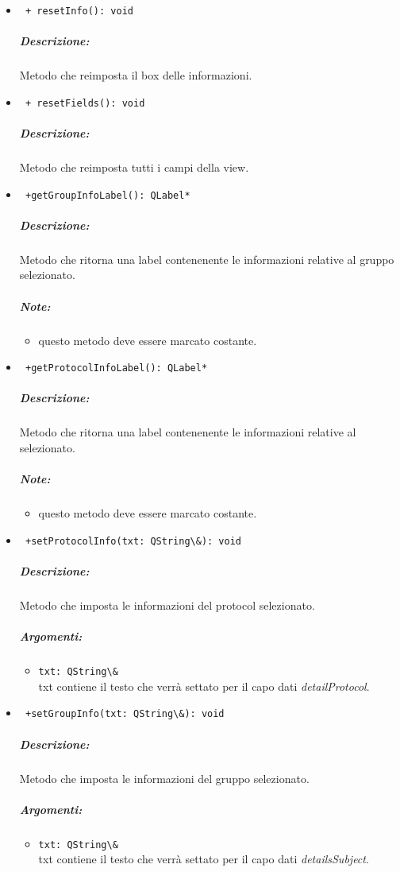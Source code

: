 \begin{itemize}
\item\color{blue}\verb! + resetInfo(): void!
\color{black} 
\subparagraph{Descrizione:}Metodo che reimposta il box delle informazioni.

\item\color{blue}\verb! + resetFields(): void!
\color{black} 
\subparagraph{Descrizione:}Metodo che reimposta tutti i campi della view.    

\item\color{blue}\verb! +getGroupInfoLabel(): QLabel*!
\color{black} 
\subparagraph{Descrizione:}Metodo che ritorna una label contenenente le informazioni relative al gruppo selezionato.  
 \subparagraph{Note:}
 \begin{itemize}
 \item questo metodo deve essere marcato costante.
 \end{itemize}
 
\item\color{blue}\verb! +getProtocolInfoLabel(): QLabel*!
\color{black} 
\subparagraph{Descrizione:}Metodo che ritorna una label contenenente le informazioni relative al \protocol{} selezionato.  
 \subparagraph{Note:}
 \begin{itemize}
 \item questo metodo deve essere marcato costante.
 \end{itemize}
 
\item\color{blue}\verb! +setProtocolInfo(txt: QString\&): void!
\color{black}
\subparagraph{Descrizione:} Metodo che imposta le informazioni del protocol selezionato.  
 \subparagraph{Argomenti:}
 \begin{itemize}
 \item \color{RoyalPurple} \verb!txt: QString\& !\\ txt contiene il testo che verrà settato per il capo dati \emph{detailProtocol}.
 \end{itemize}
 
\item\color{blue}\verb! +setGroupInfo(txt: QString\&): void!
\color{black}
\subparagraph{Descrizione:} Metodo che imposta le informazioni del gruppo selezionato.  
 \subparagraph{Argomenti:}
 \begin{itemize}
 \item \color{RoyalPurple} \verb!txt: QString\& !\\ txt contiene il testo che verrà settato per il capo dati \emph{detailsSubject}.
 \end{itemize}
 

\end{itemize}
